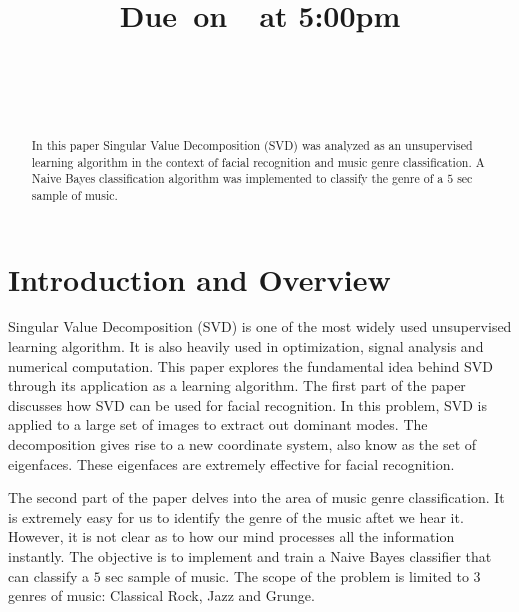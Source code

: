 \documentclass{article}
\title{
    \vspace{2in}
    \textmd{\textbf{\hmwkClass}}\\
    \vspace{0.3in}\textmd{\textbf{\hmwkTitle}}\\
    \normalsize\vspace{0.1in}\small{Due\ on\ \hmwkDueDate\ at 5:00pm}\\
    \vspace{0.1in}\large{\textit{\hmwkClassInstructor}} \\
    \vspace{0.1in}\large{{\hmwkClassSection}} \\
    \vspace{2.5in}
}
\author{\hmwkAuthorName}
\date{}
\begin{document}
\maketitle
\pagebreak

\begin{abstract}
In this paper Singular Value Decomposition (SVD) was analyzed as an unsupervised learning algorithm in the context of facial recognition and music genre classification. A Naive Bayes classification algorithm was implemented to classify the genre of a $5$ sec sample of music.

\end{abstract}

\section{Introduction and Overview}
Singular Value Decomposition (SVD) is one of the most widely used unsupervised learning algorithm. It is also heavily used in optimization, signal analysis and numerical computation. This paper explores the fundamental idea behind SVD through its application as a learning algorithm. The first part of the paper discusses how SVD can be used for facial recognition. In this problem, SVD is applied to a large set of images to extract out dominant modes. The decomposition gives rise to a new coordinate system, also know as the set of eigenfaces. These eigenfaces are extremely effective for facial recognition.

The second part of the paper delves into the area of music genre classification. It is extremely easy for us to identify the genre of the music aftet we hear it. However, it is not clear as to how our mind processes all the information instantly. The objective is to implement and train a Naive Bayes classifier that can classify a $5$ sec sample of music. The scope of the problem is limited to $3$ genres of music: Classical Rock, Jazz and Grunge.


\end{document}
